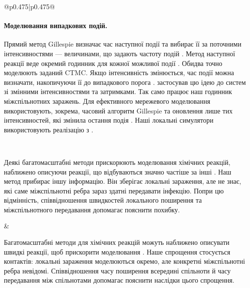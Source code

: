 \documentclass[11pt]{article}
\begin{document}
\begin{longtable}{@{}p{0.475\textwidth}|p{0.475\textwidth}@{}}
\begin{minipage}[t]{\linewidth}
\paragraph{Моделювання випадкових подій.}
Прямий метод Gillespie визначає час наступної події та вибирає її за поточними інтенсивностями --- величинами, що задають частоту подій \citep{gillespie1977exact}. Метод наступної реакції веде окремий годинник для кожної можливої події \citep{gibson2000}. Обидва точно моделюють заданий CTMC. Якщо інтенсивність змінюється, час події можна визначати, накопичуючи її до випадкового порога \citep{ethier1986}. \citet{anderson2007} застосував цю ідею до систем зі змінними інтенсивностями та затримками. Так само працює наш годинник міжспільнотних заражень. Для ефективного мережевого моделювання використовують, зокрема, часовий алгоритм Gillespie та оновлення лише тих інтенсивностей, які змінила остання подія \citep{vestergaard2015,kuryliak2025simulating}. Наші локальні симулятори використовують реалізацію з \citet{kuryliak2025simulating}.
\end{minipage} \\[5mm]
\begin{minipage}[t]{\linewidth}
Деякі багатомасштабні методи прискорюють моделювання хімічних реакцій, наближено описуючи реакції, що відбуваються значно частіше за інші \citep{haseltine2002,cao2005slow}. Наш метод прибирає іншу інформацію. Він зберігає локальні зараження, але не знає, які саме міжспільнотні ребра зараз здатні передавати інфекцію. Попри цю відмінність, співвідношення швидкостей локального поширення та міжспільнотного передавання допомагає пояснити похибку.
\end{minipage} &
\begin{minipage}[t]{\linewidth}
Багатомасштабні методи для хімічних реакцій можуть наближено описувати швидкі реакції, щоб прискорити моделювання \citep{haseltine2002,cao2005slow}. Наше спрощення стосується контактів: локальні зараження моделюються окремо, але конкретні міжспільнотні ребра невідомі. Співвідношення часу поширення всередині спільноти й часу передавання між спільнотами допомагає пояснити наслідки цього спрощення.
\end{minipage} \\[5mm]
\begin{minipage}[t]{\linewidth}

\end{minipage}
\end{longtable}
\end{document}
